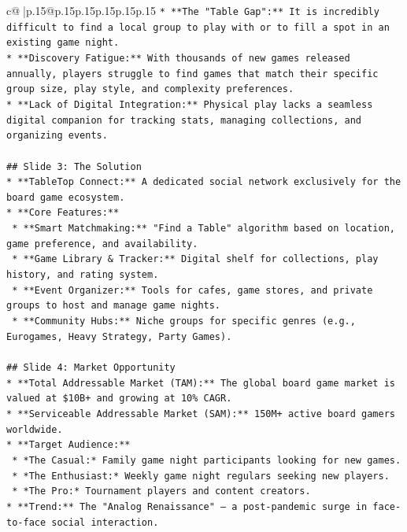 \documentclass{article}
\begin{document}
{\begin{supertabular}{c@{$\;$}|p{.15\linewidth}@{}p{.15\linewidth}p{.15\linewidth}p{.15\linewidth}p{.15\linewidth}p{.15\linewidth}}
{{{\texttt{*   **The "Table Gap":** It is incredibly difficult to find a local group to play with or to fill a spot in an existing game night.} \\
\texttt{*   **Discovery Fatigue:** With thousands of new games released annually, players struggle to find games that match their specific group size, play style, and complexity preferences.} \\
\texttt{*   **Lack of Digital Integration:** Physical play lacks a seamless digital companion for tracking stats, managing collections, and organizing events.} \\
\\ 
\texttt{\#\# Slide 3: The Solution} \\
\texttt{*   **TableTop Connect:** A dedicated social network exclusively for the board game ecosystem.} \\
\texttt{*   **Core Features:**} \\
\texttt{    *   **Smart Matchmaking:** "Find a Table" algorithm based on location, game preference, and availability.} \\
\texttt{    *   **Game Library \& Tracker:** Digital shelf for collections, play history, and rating system.} \\
\texttt{    *   **Event Organizer:** Tools for cafes, game stores, and private groups to host and manage game nights.} \\
\texttt{    *   **Community Hubs:** Niche groups for specific genres (e.g., Eurogames, Heavy Strategy, Party Games).} \\
\\ 
\texttt{\#\# Slide 4: Market Opportunity} \\
\texttt{*   **Total Addressable Market (TAM):** The global board game market is valued at \$10B+ and growing at 10\% CAGR.} \\
\texttt{*   **Serviceable Addressable Market (SAM):** 150M+ active board gamers worldwide.} \\
\texttt{*   **Target Audience:**} \\
\texttt{    *   *The Casual:* Family game night participants looking for new games.} \\
\texttt{    *   *The Enthusiast:* Weekly game night regulars seeking new players.} \\
\texttt{    *   *The Pro:* Tournament players and content creators.} \\
\texttt{*   **Trend:** The "Analog Renaissance" – a post{-}pandemic surge in face{-}to{-}face social interaction.} \\
}}}
\end{supertabular}}
\end{document}
